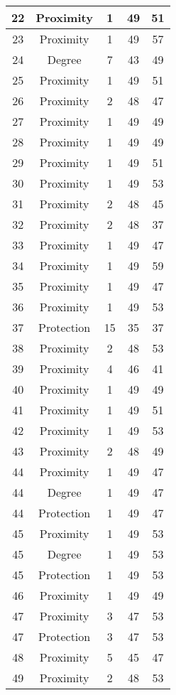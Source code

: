 \documentclass[results.tex]{subfiles}
\begin{document}
\begin{center}
\begin{tabular}{| c || c | c | c | c |}
    \hline
    22 & Proximity & 1 & 49 & 51 \\ 
    \hline
    23 & Proximity & 1 & 49 & 57 \\ 
    \hline
    24 & Degree & 7 & 43 & 49 \\ 
    \hline
    25 & Proximity & 1 & 49 & 51 \\ 
    \hline
    26 & Proximity & 2 & 48 & 47 \\ 
    \hline
    27 & Proximity & 1 & 49 & 49 \\ 
    \hline
    28 & Proximity & 1 & 49 & 49 \\ 
    \hline
    29 & Proximity & 1 & 49 & 51 \\ 
    \hline
    30 & Proximity & 1 & 49 & 53 \\ 
    \hline
    31 & Proximity & 2 & 48 & 45 \\ 
    \hline
    32 & Proximity & 2 & 48 & 37 \\ 
    \hline
    33 & Proximity & 1 & 49 & 47 \\ 
    \hline
    34 & Proximity & 1 & 49 & 59 \\ 
    \hline
    35 & Proximity & 1 & 49 & 47 \\ 
    \hline
    36 & Proximity & 1 & 49 & 53 \\ 
    \hline
    37 & Protection & 15 & 35 & 37 \\ 
    \hline
    38 & Proximity & 2 & 48 & 53 \\ 
    \hline
    39 & Proximity & 4 & 46 & 41 \\ 
    \hline
    40 & Proximity & 1 & 49 & 49 \\ 
    \hline
    41 & Proximity & 1 & 49 & 51 \\ 
    \hline
    42 & Proximity & 1 & 49 & 53 \\ 
    \hline
    43 & Proximity & 2 & 48 & 49 \\ 
    \hline
    44 & Proximity & 1 & 49 & 47 \\ 
    \hline
    44 & Degree & 1 & 49 & 47 \\ 
    \hline
    44 & Protection & 1 & 49 & 47 \\ 
    \hline
    45 & Proximity & 1 & 49 & 53 \\ 
    \hline
    45 & Degree & 1 & 49 & 53 \\ 
    \hline
    45 & Protection & 1 & 49 & 53 \\ 
    \hline
    46 & Proximity & 1 & 49 & 49 \\ 
    \hline
    47 & Proximity & 3 & 47 & 53 \\ 
    \hline
    47 & Protection & 3 & 47 & 53 \\ 
    \hline
    48 & Proximity & 5 & 45 & 47 \\ 
    \hline
    49 & Proximity & 2 & 48 & 53 \\ 
    \hline   \end{tabular}
\end{center}
\end{document}
